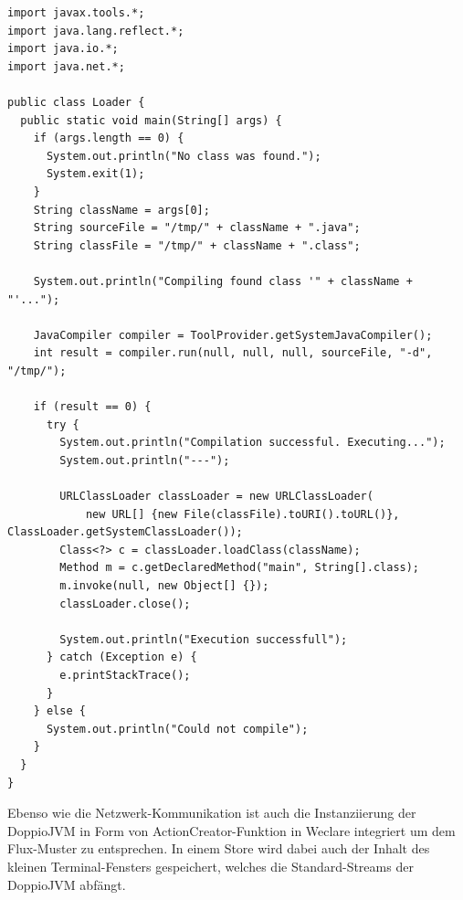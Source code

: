 \begin{minipage}{\linewidth}
\begin{lstlisting}[caption={Java-Loader, der programmatisch Quelltext kompiliert und ausführt. (aus: public/doppio/Loader.java)}]
import javax.tools.*;
import java.lang.reflect.*;
import java.io.*;
import java.net.*;

public class Loader {
  public static void main(String[] args) {
    if (args.length == 0) {
      System.out.println("No class was found.");
      System.exit(1);
    }
    String className = args[0];
    String sourceFile = "/tmp/" + className + ".java";
    String classFile = "/tmp/" + className + ".class";

    System.out.println("Compiling found class '" + className + "'...");

    JavaCompiler compiler = ToolProvider.getSystemJavaCompiler();
    int result = compiler.run(null, null, null, sourceFile, "-d", "/tmp/");

    if (result == 0) {
      try {
        System.out.println("Compilation successful. Executing...");
        System.out.println("---");

        URLClassLoader classLoader = new URLClassLoader(
            new URL[] {new File(classFile).toURI().toURL()}, ClassLoader.getSystemClassLoader());
        Class<?> c = classLoader.loadClass(className);
        Method m = c.getDeclaredMethod("main", String[].class);
        m.invoke(null, new Object[] {});
        classLoader.close();

        System.out.println("Execution successfull");
      } catch (Exception e) {
        e.printStackTrace();
      }
    } else {
      System.out.println("Could not compile");
    }
  }
}
\end{lstlisting}
\end{minipage}

Ebenso wie die Netzwerk-Kommunikation ist auch die Instanziierung der DoppioJVM in Form von ActionCreator-Funktion in Weclare integriert um dem Flux-Muster zu entsprechen. In einem Store wird dabei auch der Inhalt des kleinen Terminal-Fensters gespeichert, welches die Standard-Streams der DoppioJVM abfängt.

